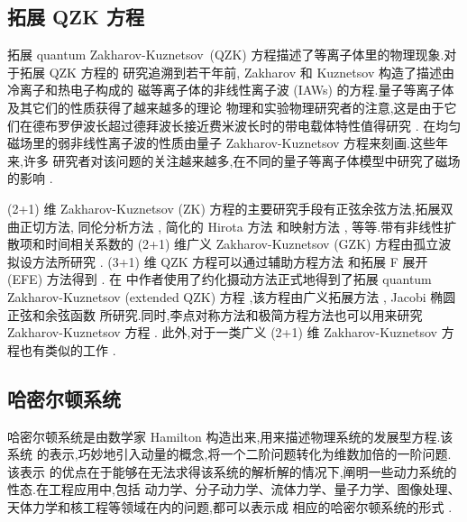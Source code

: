 \subsection{拓展 QZK 方程}

拓展 quantum Zakharov-Kuznetsov~(QZK) 方程描述了等离子体里的物理现象.对于拓展 QZK 方程的
研究追溯到若干年前, Zakharov 和 Kuznetsov \cite{abdou2011quant} 构造了描述由冷离子和热电子构成的
磁等离子体的非线性离子波 (IAWs) 的方程.量子等离子体及其它们的性质获得了越来越多的理论
物理和实验物理研究者的注意,这是由于它们在德布罗伊波长超过德拜波长接近费米波长时的带电载体特性值得研究 \cite{abdou2011quant,ahmed2013kinks,bhrawy2013soli,biswas20091soli,biswas2013soli,bluman2010appli,elganaini2011tra,godleswski2004the,guner2015bright,ibragimov2006inte}. 在均匀磁场里的弱非线性离子波的性质由量子 Zakharov-Kuznetsov 方程来刻画.这些年来,许多
研究者对该问题的关注越来越多,在不同的量子等离子体模型中研究了磁场的影响 \cite{ibragimov2007anew,iwasaki1990cylin,johnpilai2011sym,khan2008linear,krishnan2010sol,leveque1992num,linares2009well,linares2011local,morris2013soli,moslem2007soli,mothibi2015con,moussa2001simi,munro2014con,munro2000sta,mushtaq2005non,olver2000app,peng2008exact,sabry2009non}.

(2+1) 维 Zakharov-Kuznetsov (ZK) 方程的主要研究手段有正弦余弦方法,拓展双曲正切方法,
同伦分析方法 \cite{linares2009well}, 简化的 Hirota 方法 \cite{biswas2013soli,bluman2010appli}
和映射方法 \cite{morris2013soli}, 等等.带有非线性扩散项和时间相关系数的 (2+1) 维广义
Zakharov-Kuznetsov (GZK) 方程由孤立波拟设方法所研究 \cite{sabry2009non}. (3+1) 维 QZK
方程可以通过辅助方程方法 \cite{ahmed2013kinks} 和拓展 F 展开 (EFE) 方法得到 \cite{munro2000sta}.
在 \cite{ahmed2013kinks} 中作者使用了约化摄动方法正式地得到了拓展 quantum Zakharov-Kuznetsov (extended QZK) 方程
,该方程由广义拓展方法 \cite{guner2015bright}, Jacobi 椭圆正弦和余弦函数 \cite{biswas20091soli}
所研究.同时,李点对称方法和极简方程方法也可以用来研究 Zakharov-Kuznetsov 方程 \cite{leveque1992num}.
此外,对于一类广义 (2+1) 维 Zakharov-Kuznetsov 方程也有类似的工作 \cite{moslem2007soli}.

\subsection{哈密尔顿系统}

哈密尔顿系统是由数学家 Hamilton 构造出来,用来描述物理系统的发展型方程.该系统
的表示,巧妙地引入动量的概念,将一个二阶问题转化为维数加倍的一阶问题.该表示
的优点在于能够在无法求得该系统的解析解的情况下,阐明一些动力系统的性态.在工程应用中,包括
动力学、分子动力学、流体力学、量子力学、图像处理、天体力学和核工程等领域在内的问题,都可以表示成
相应的哈密尔顿系统的形式 \cite{arieh2009afirst}.

